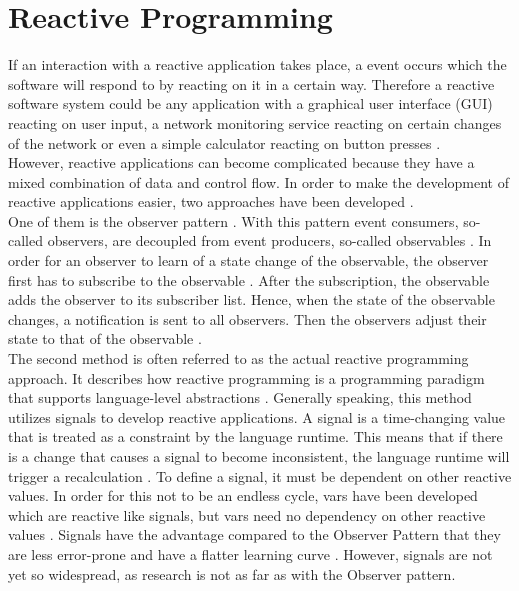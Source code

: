 \documentclass[Bachelor,BIF,english]{twbook}
\begin{document}
\section{Reactive Programming}
If an interaction with a reactive application takes place, a event occurs which the software will respond to by reacting on it in a certain way. Therefore a reactive software system could be any application with a graphical user interface (GUI) reacting on user input, a network monitoring service reacting on certain changes of the network or even a simple calculator reacting on button presses \cite[p.~728]{DebuggingRPWithRInspector}. 
\\[\baselineskip]
However, reactive applications can become complicated because they have a mixed combination of data and control flow. In order to make the development of reactive applications easier, two approaches have been developed \cite[p.~1]{PositivEffectOfRP}.
\\[\baselineskip]
One of them is the observer pattern \cite[p.~360]{ObserverDP}. With this pattern event consumers, so-called observers, are decoupled from event producers, so-called observables \cite[p.~953]{RPWalkthrough}. In order for an observer to learn of a state change of the observable, the observer first has to subscribe to the observable \cite[p.~362]{ObserverDP}. After the subscription, the observable adds the observer to its subscriber list. Hence, when the state of the observable changes, a notification is sent to all observers. Then the observers adjust their state to that of the observable \cite[p.~363]{ObserverDP}.
\\[\baselineskip]
The second method is often referred to as the actual reactive programming approach. It describes how reactive programming is a programming paradigm that supports language-level abstractions \cite[p.~953]{RPWalkthrough}. Generally speaking, this method utilizes signals to develop reactive applications. A signal is a time-changing value that is treated as a constraint by the language runtime. This means that if there is a change that causes a signal to become inconsistent, the language runtime will trigger a recalculation \cite[p.~797]{DebuggingRP} \cite[p.~3]{PositivEffectOfRP}. To define a signal, it must be dependent on other reactive values. In order for this not to be an endless cycle, vars have been developed which are reactive like signals, but vars need no dependency on other reactive values \cite[p.~2]{PositivEffectOfRP}. Signals have the advantage compared to the Observer Pattern that they are less error-prone and have a flatter learning curve \cite[p.~796]{DebuggingRP}. However, signals are not yet so widespread, as research is not as far as with the Observer pattern.
\end{document}
